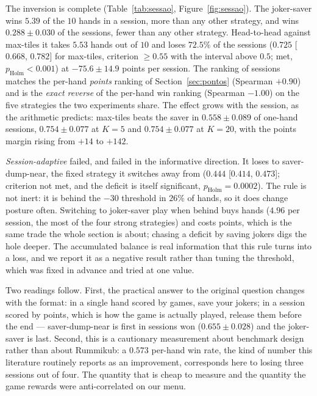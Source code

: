 \documentclass[11pt]{article}
\begin{document}
The inversion is complete (Table~\ref{tab:sessao}, Figure~\ref{fig:sessao}). The joker-saver wins $5.39$ of the $10$ hands in a session, more than any other strategy, and wins $0.288\pm0.030$ of the sessions, fewer than any other strategy. Head-to-head against max-tiles it takes $5.53$ hands out of $10$ and loses $72.5\%$ of the sessions ($0.725$ [$0.668$, $0.782$] for max-tiles, criterion $\ge0.55$ with the interval above $0.5$; met, $p_{\text{Holm}}<0.001$) at $-75.6\pm14.9$ points per session. The ranking of sessions matches the per-hand \emph{points} ranking of Section~\ref{sec:pontos} (Spearman $+0.90$) and is the \emph{exact reverse} of the per-hand win ranking (Spearman $-1.00$) on the five strategies the two experiments share. The effect grows with the session, as the arithmetic predicts: max-tiles beats the saver in $0.558\pm0.089$ of one-hand sessions, $0.754\pm0.077$ at $K=5$ and $0.754\pm0.077$ at $K=20$, with the points margin rising from $+14$ to $+142$.

\emph{Session-adaptive} failed, and failed in the informative direction. It loses to saver-dump-near, the fixed strategy it switches away from ($0.444$ [$0.414$, $0.473$]; criterion not met, and the deficit is itself significant, $p_{\text{Holm}}=0.0002$). The rule is not inert: it is behind the $-30$ threshold in $26\%$ of hands, so it does change posture often. Switching to joker-saver play when behind buys hands ($4.96$ per session, the most of the four strong strategies) and costs points, which is the same trade the whole section is about; chasing a deficit by saving jokers digs the hole deeper. The accumulated balance is real information that this rule turns into a loss, and we report it as a negative result rather than tuning the threshold, which was fixed in advance and tried at one value.

Two readings follow. First, the practical answer to the original question changes with the format: in a single hand scored by games, save your jokers; in a session scored by points, which is how the game is actually played, release them before the end --- saver-dump-near is first in sessions won ($0.655\pm0.028$) and the joker-saver is last. Second, this is a cautionary measurement about benchmark design rather than about Rummikub: a $0.573$ per-hand win rate, the kind of number this literature routinely reports as an improvement, corresponds here to losing three sessions out of four. The quantity that is cheap to measure and the quantity the game rewards were anti-correlated on our menu.
\end{document}
